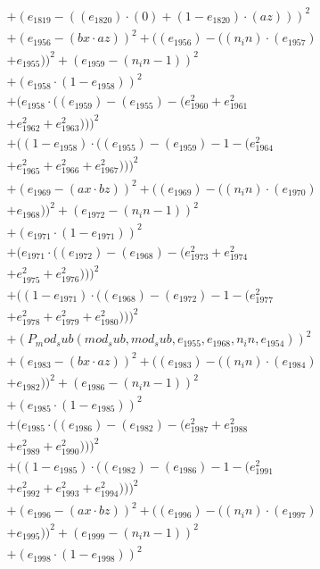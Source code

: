 \documentclass[10pt, a4paper]{article}
\begin{document}
\begin{align*}
& + (e_{1819} - ((e_{1820})  \cdot  (0) + (1 - e_{1820})  \cdot  (az)))^{2} \\
& + (e_{1956} - (bx  \cdot  az))^{2} + ((e_{1956}) - ((n_in)  \cdot  (e_{1957}) \\
& + e_{1955}))^{2} + (e_{1959} - (n_in - 1))^{2} \\
& + (e_{1958}  \cdot  (1 - e_{1958}))^{2} \\
& + (e_{1958}  \cdot  ((e_{1959}) - (e_{1955}) - (e_{1960}^{2} + e_{1961}^{2} \\
& + e_{1962}^{2} + e_{1963}^{2})))^{2} \\
& + ((1 - e_{1958})  \cdot  ((e_{1955}) - (e_{1959}) - 1 - (e_{1964}^{2} \\
& + e_{1965}^{2} + e_{1966}^{2} + e_{1967}^{2})))^{2} \\
& + (e_{1969} - (ax  \cdot  bz))^{2} + ((e_{1969}) - ((n_in)  \cdot  (e_{1970}) \\
& + e_{1968}))^{2} + (e_{1972} - (n_in - 1))^{2} \\
& + (e_{1971}  \cdot  (1 - e_{1971}))^{2} \\
& + (e_{1971}  \cdot  ((e_{1972}) - (e_{1968}) - (e_{1973}^{2} + e_{1974}^{2} \\
& + e_{1975}^{2} + e_{1976}^{2})))^{2} \\
& + ((1 - e_{1971})  \cdot  ((e_{1968}) - (e_{1972}) - 1 - (e_{1977}^{2} \\
& + e_{1978}^{2} + e_{1979}^{2} + e_{1980}^{2})))^{2} \\
& + (P_mod_sub(mod_sub, mod_sub, e_{1955}, e_{1968}, n_in, e_{1954}))^{2} \\
& + (e_{1983} - (bx  \cdot  az))^{2} + ((e_{1983}) - ((n_in)  \cdot  (e_{1984}) \\
& + e_{1982}))^{2} + (e_{1986} - (n_in - 1))^{2} \\
& + (e_{1985}  \cdot  (1 - e_{1985}))^{2} \\
& + (e_{1985}  \cdot  ((e_{1986}) - (e_{1982}) - (e_{1987}^{2} + e_{1988}^{2} \\
& + e_{1989}^{2} + e_{1990}^{2})))^{2} \\
& + ((1 - e_{1985})  \cdot  ((e_{1982}) - (e_{1986}) - 1 - (e_{1991}^{2} \\
& + e_{1992}^{2} + e_{1993}^{2} + e_{1994}^{2})))^{2} \\
& + (e_{1996} - (ax  \cdot  bz))^{2} + ((e_{1996}) - ((n_in)  \cdot  (e_{1997}) \\
& + e_{1995}))^{2} + (e_{1999} - (n_in - 1))^{2} \\
& + (e_{1998}  \cdot  (1 - e_{1998}))^{2} \\

\end{align*}
\end{document}
